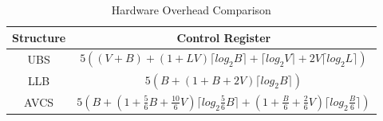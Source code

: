 \documentclass[10pt,conference]{IEEEtran}
\begin{document}

\begin{table}
\caption{Hardware Overhead Comparison}\label{control}
\centering\begin{tabular}{c|c}
\hline
\hline
Structure & Control Register\\
\hline
UBS \cite{NPKV06}  &   $5((V+B)+(1+LV)\lceil log_2B\rceil+\lceil log_2V\rceil+2V\lceil log_2L\rceil)$\\
\hline
LLB \cite{4555894} & $5(B+(1+B+2V) \lceil log_2B\rceil)$\\
\hline
AVCS    & $5(B+(1+\frac{5}{6}B+\frac{10}{6}V)\lceil log_2\frac{5}{6}B\rceil +(1+\frac{B}{6}+\frac{2}{6}V)\lceil log_2\frac{B}{6}\rceil)$\\
\hline
\end{tabular}
\end{table}
\end{document}
